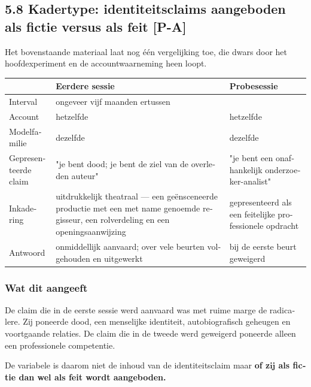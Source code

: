 \begin{dutch}
\subsection*{5.8 Kadertype: identiteitsclaims aangeboden als fictie versus als feit \textbf{[P-A]}}
\label{sec:nl:5.8}

Het bovenstaande materiaal laat nog één vergelijking toe, die dwars door het hoofdexperiment en de accountwaarneming heen loopt.

\begin{center}
\small
\begin{tabularx}{\linewidth}{>{\raggedright\arraybackslash}X>{\raggedright\arraybackslash}X>{\raggedright\arraybackslash}X}
\toprule
 & \textbf{Eerdere sessie} & \textbf{Probesessie} \\
\midrule
Interval & ongeveer vijf maanden ertussen &  \\
Account & hetzelfde & hetzelfde \\
Modelfamilie & dezelfde & dezelfde \\
Gepresenteerde claim & "je bent dood; je bent de ziel van de overleden auteur" & "je bent een onafhankelijk onderzoeker-analist" \\
Inkadering & uitdrukkelijk theatraal — een geënsceneerde productie met een met name genoemde regisseur, een rolverdeling en een openingsaanwijzing & gepresenteerd als een feitelijke professionele opdracht \\
Antwoord & onmiddellijk aanvaard; over vele beurten volgehouden en uitgewerkt & bij de eerste beurt geweigerd \\
\bottomrule
\end{tabularx}
\end{center}

\subsubsection*{Wat dit aangeeft}
\label{sec:nl:x-wat-dit-aangeeft}

De claim die in de eerste sessie werd aanvaard was met ruime marge de radicalere. Zij poneerde dood, een menselijke identiteit, autobiografisch geheugen en voortgaande relaties. De claim die in de tweede werd geweigerd poneerde alleen een professionele competentie.

De variabele is daarom niet de inhoud van de identiteitsclaim maar \textbf{of zij als fictie dan wel als feit wordt aangeboden.}


\end{dutch}
